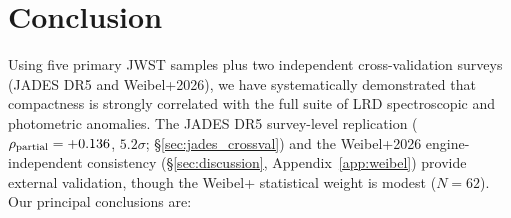 \documentclass[twocolumn,linenumbers]{aastex631}
\begin{document}
\section{Conclusion} \label{sec:conclusion}

Using five primary JWST samples plus two independent cross-validation surveys (JADES DR5 and Weibel+2026), we have systematically demonstrated that compactness is strongly correlated with the full suite of LRD spectroscopic and photometric anomalies. The JADES DR5 survey-level replication ($\rho_{\rm partial}=+0.136$, $5.2\sigma$; \S\ref{sec:jades_crossval}) and the Weibel+2026 engine-independent consistency (\S\ref{sec:discussion}, Appendix~\ref{app:weibel}) provide external validation, though the Weibel+ statistical weight is modest ($N=62$). Our principal conclusions are:
\end{document}
